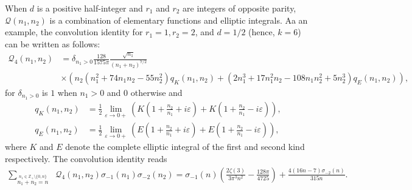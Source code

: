 \documentclass[]{article}
\begin{document}
 When $d$ is a positive half-integer and $r_1$ and $r_2$ are integers of opposite parity,  $\mathcal{Q}(n_1,n_2)$ is a combination of elementary functions and elliptic integrals. Aa an example, the convolution identity for $r_1=1, r_2 = 2$, and $d=1/2$ (hence, $k=6$) can be written as follows: \begin{equation}
    \begin{split}
\mathcal{Q}_4(n_1,n_2)  &  =\delta_{n_1 > 0}  \frac{128   }{1575 \pi }  \frac{\sqrt{n_1}}{(n_1+n_2)^{7/2}} \\
        & \times \left(n_2 \left(n_1^2+74 n_1 n_2-55 n_2^2\right) q_K(n_1, n_2)  +\left(2 n_1^3+17 n_1^2 n_2-108 n_1 n_2^2+5 n_2^3\right) q_E(n_1, n_2) \right) ,
    \end{split}
\end{equation}
for $\delta_{n_1>0}$ is $1$ when $n_1>0$ and $0$ otherwise and 
\begin{equation}
\begin{split}
    q_K(n_1, n_2) &= \frac{1}{2} \lim_{\varepsilon \to 0+} ( K(1+\tfrac{n_2}{n_1}+i \varepsilon) +K(1+\tfrac{n_2}{n_1}-i \varepsilon)), \\ 
    q_E(n_1, n_2) &= \frac{1}{2} \lim_{\varepsilon \to 0+} ( E(1+\tfrac{n_2}{n_1}+i \varepsilon) +E(1+\tfrac{n_2}{n_1}-i \varepsilon)), 
\end{split}
    \end{equation}
 where $K$ and $E$ denote the complete elliptic integral of the first and second kind respectively.
The convolution identity reads 
\begin{equation}
    \begin{split}
    \sum_{ \stackrel{n_1 \in \mathbb{Z}_+ \setminus \{ 0,n \}}{n_1+n_2=n}  } & \mathcal{Q}_4(n_1, n_2) \sigma_{-1}(n_1) \sigma_{-2} (n_2) =  \sigma _{-1}(n) \left(\frac{2 \zeta (3)}{3 \pi ^3 n^2}-\frac{128 \pi }{4725}\right)+\frac{4 (16 n-7) \sigma _{-2}(n)}{315 n}.
    \end{split}
\end{equation}
\iffalse 
\end{document}
